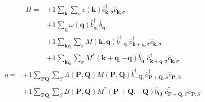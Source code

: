\begin{align*}
	H = 	&+1 \sum_{ \mathbf{k} } \sum_{ \sigma } \epsilon( \mathbf{k} )   \hat{c}_{ \mathbf{k}, \sigma }^\dagger  \hat{c}_{ \mathbf{k}, \sigma }^{\phantom{\dagger}}  \\
	&+1 \sum_{ \mathbf{q} } \omega( \mathbf{q} )   \hat{b}_{ \mathbf{q}, }^\dagger  \hat{b}_{ \mathbf{q}, }^{\phantom{\dagger}}  \\
	&+1 \sum_{ \mathbf{k} \mathbf{q} } \sum_{ \sigma } M( \mathbf{k}, \mathbf{q} )   \hat{b}_{ -\mathbf{q}, }^\dagger  \hat{c}_{ \mathbf{k}+\mathbf{q}, \sigma }^\dagger  \hat{c}_{ \mathbf{k}, \sigma }^{\phantom{\dagger}}  \\
	&+1 \sum_{ \mathbf{k} \mathbf{q} } \sum_{ \sigma } M^*( \mathbf{k}+\mathbf{q}, -\mathbf{q} )   \hat{b}_{ \mathbf{q}, }^{\phantom{\dagger}} \hat{c}_{ \mathbf{k}+\mathbf{q}, \sigma }^\dagger  \hat{c}_{ \mathbf{k}, \sigma }^{\phantom{\dagger}} 
\end{align*}
\begin{align*}
	\eta = 	&+1 \sum_{ \mathbf{P} \mathbf{Q} } \sum_{ S } A( \mathbf{P}, \mathbf{Q} )  M( \mathbf{P}, \mathbf{Q} )   \hat{b}_{ -\mathbf{Q}, }^\dagger  \hat{c}_{ \mathbf{P}+\mathbf{Q}, S }^\dagger  \hat{c}_{ \mathbf{P}, S }^{\phantom{\dagger}}  \\
	&+1 \sum_{ \mathbf{P} \mathbf{Q} } \sum_{ S } B( \mathbf{P}, \mathbf{Q} )  M^*( \mathbf{P}+\mathbf{Q}, -\mathbf{Q} )   \hat{b}_{ \mathbf{Q}, }^{\phantom{\dagger}} \hat{c}_{ \mathbf{P}+\mathbf{Q}, S }^\dagger  \hat{c}_{ \mathbf{P}, S }^{\phantom{\dagger}} 
\end{align*}
